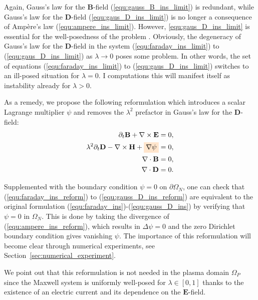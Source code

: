 \documentclass{article}
\begin{document}
Again, Gauss's law for the $\mathbf{B}$-field (\ref{equ:gauss_B_ins_limit}) is redundant,
while Gauss's law for the $\mathbf{D}$-field (\ref{equ:gaus_D_ins_limit}) is no longer a
consequence of Amp\`{e}re's law (\ref{equ:ampere_ins_limit}). However,
\eqref{equ:gaus_D_ins_limit} is essential for the well-posedness of the problem \cite[][p.
7]{ana_2010}. Obviously, the degeneracy of Gauss's law for the $\mathbf{D}$-field in the
system (\ref{equ:faraday_ins_limit}) to (\ref{equ:gaus_D_ins_limit}) as
$\lambda \rightarrow 0$ poses some problem. In other words, the set of equations
(\ref{equ:faraday_ins_limit}) to (\ref{equ:gaus_D_ins_limit}) switches to an ill-posed
situation for $\lambda=0$. I computations this will manifest itself as instability 
already for ${\lambda>0}$.

As a remedy, we propose the following reformulation which introduces a scalar Lagrange
multiplier $\psi$ and removes the $\lambda^2$ prefactor in Gauss's law for the
$\mathbf{D}$-field:
\begin{subequations}
\begin{align}
    \partial_t \mathbf{B} + \nabla \times \mathbf{E} &= 0, \label{equ:faraday_ins_reform}\\ 
    \lambda^2 \partial_t \mathbf{D} - \nabla \times \mathbf{H} + \colorbox{orange!20}{$\nabla \psi$} &= 0,  \label{equ:ampere_ins_reform}\\
    \nabla \cdot \mathbf{B} &= 0, \label{equ:gauss_B_ins_reform}\\
    \nabla \cdot \mathbf{D} &= 0 \label{equ:gauss_D_ins_reform}.
\end{align}
\end{subequations}

Supplemented with the boundary condition $\psi = 0$ on $\partial\Omega_N$, one can check
that (\ref{equ:faraday_ins_reform}) to (\ref{equ:gauss_D_ins_reform}) are equivalent to
the original formulation (\ref{equ:faraday_ins})-(\ref{equ:gauss_D_ins}) by verifying that
$\psi = 0$ in $\Omega_N$. This is done by taking the divergence of
(\ref{equ:ampere_ins_reform}), which results in $\Delta\psi = 0$ and the zero Dirichlet
boundary condition gives vanishing $\psi$. The importance of this reformulation will
become clear through numerical experiments, see Section~\ref{sec:numerical_experiment}.

We point out that this reformulation is not needed in the plasma domain $\Omega_P$ since
the Maxwell system is uniformly well-posed for $\lambda \in [0,1]$ thanks to the existence
of an electric current and its dependence on the $\mathbf{E}$-field.
\end{document}
